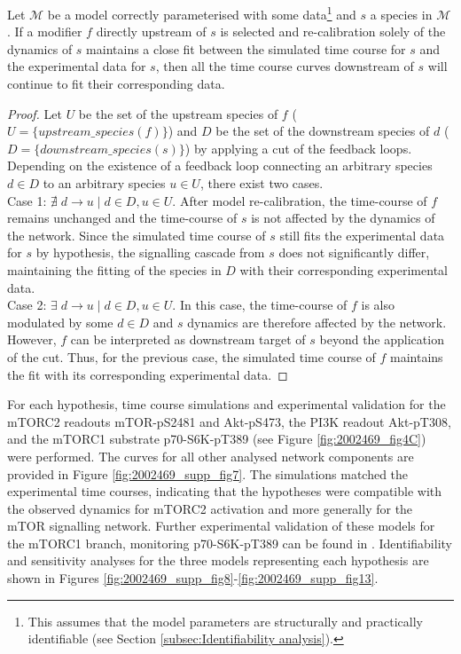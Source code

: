 \begin{lemma}
\label{lemma:model derivation}
Let $\mathcal{M}$ be a model correctly parameterised with some data\footnote{This assumes that the model parameters are structurally and practically identifiable (see Section \ref{subsec:Identifiability analysis}).} and $s$ a species in $\mathcal{M}$. If a modifier $f$ directly upstream of $s$ is selected and re-calibration solely of the dynamics of $s$ maintains a close fit between the simulated time course for $s$ and the experimental data for $s$, then all the time course curves downstream of $s$ will continue to fit their corresponding data. 
\end{lemma}
\begin{proof}
Let $U$ be the set of the upstream species of $f$ ($U = \{ upstream\_species(f) \}$) and $D$ be the set of the downstream species of $d$ ($D = \{ downstream\_species(s) \}$) by applying a cut of the feedback loops. Depending on the existence of a feedback loop connecting an arbitrary species $d \in D$ to an arbitrary species $u \in U$, there exist two cases.\\
Case 1: $\nexists \; d \rightarrow u \;|\; d \in D, u \in U$. After model re-calibration, the time-course of $f$ remains unchanged and the time-course of $s$ is not affected by the dynamics of the network. Since the simulated time course of $s$ still fits the experimental data for $s$ by hypothesis, the signalling cascade from $s$ does not significantly differ, maintaining the fitting of the species in $D$ with their corresponding experimental data.\\
Case 2: $\exists \; d \rightarrow u \;|\; d \in D, u \in U$. In this case, the time-course of $f$ is also modulated by some $d \in D$ and $s$ dynamics are therefore affected by the network. However, $f$ can be interpreted as downstream target of $s$ beyond the application of the cut. Thus, for the previous case, the simulated time course of $f$ maintains the fit with its corresponding experimental data.
\end{proof}

For each hypothesis, time course simulations and experimental validation for the mTORC2 readouts mTOR-pS2481 and Akt-pS473, the PI3K readout Akt-pT308, and the mTORC1 substrate p70-S6K-pT389 (see Figure \ref{fig:2002469_fig4C}) were performed. The curves for all other analysed network components are provided in Figure \ref{fig:2002469_supp_fig7}. The simulations matched the experimental time courses, indicating that the hypotheses were compatible with the observed dynamics for mTORC2 activation and more generally for the mTOR signalling network. Further experimental validation of these models for the mTORC1 branch, monitoring p70-S6K-pT389 can be found in \citep[Fig. 7A]{DallePezze2012a}. Identifiability and sensitivity analyses for the three models representing each hypothesis are shown in Figures \ref{fig:2002469_supp_fig8}-\ref{fig:2002469_supp_fig13}. 


